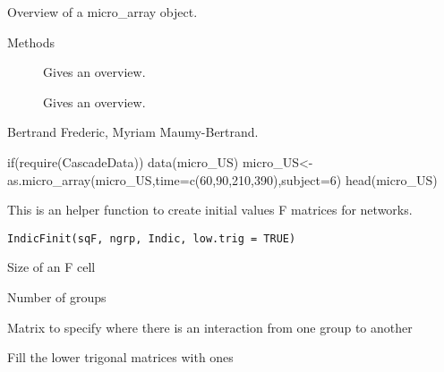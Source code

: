 \documentclass[a4paper]{book}
\begin{document}
%
\begin{Description}\relax
Overview of a micro\_array object.
\end{Description}
%
\begin{Section}{Methods}
\begin{description}


\item[] 
Gives an overview.


\item[] 
Gives an overview.


\end{description}
\end{Section}
%
\begin{Author}\relax
Bertrand Frederic, Myriam Maumy-Bertrand.
\end{Author}
%
\begin{Examples}
\begin{ExampleCode}
  if(require(CascadeData)){
	data(micro_US)
	micro_US<-as.micro_array(micro_US,time=c(60,90,210,390),subject=6)
	head(micro_US)
	}
\end{ExampleCode}
\end{Examples}
%
\begin{Description}\relax
This is an helper function to create initial values F matrices for networks.
\end{Description}
%
\begin{Usage}
\begin{verbatim}
IndicFinit(sqF, ngrp, Indic, low.trig = TRUE)
\end{verbatim}
\end{Usage}
%
\begin{Arguments}
\begin{ldescription}
\item[\code{sqF}] Size of an F cell
\item[\code{ngrp}] Number of groups
\item[\code{Indic}] Matrix to specify where there is an interaction from one group to another
\item[\code{low.trig}] Fill the lower trigonal matrices with ones
\end{ldescription}
\end{Arguments}
\end{document}
